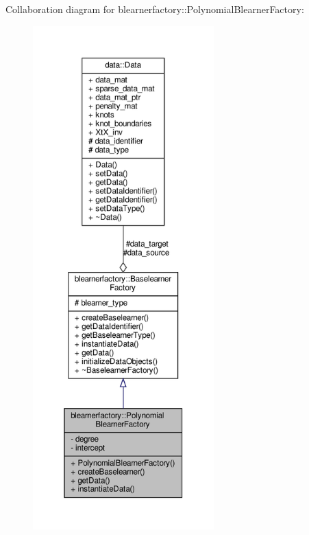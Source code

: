 Collaboration diagram for blearnerfactory\+:\+:Polynomial\+Blearner\+Factory\+:\nopagebreak
\begin{figure}[H]
\begin{center}
\leavevmode
\includegraphics[height=550pt]{classblearnerfactory_1_1_polynomial_blearner_factory__coll__graph}
\end{center}
\end{figure}
